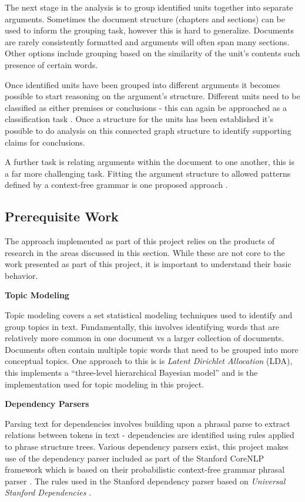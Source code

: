         The next stage in the analysis is to group identified units together into separate arguments. Sometimes the document structure (chapters and sections) can be used to inform the grouping task, however this is hard to generalize. Documents are rarely consistently formatted and arguments will often span many sections. Other options include grouping based on the similarity of the unit's contents such presence of certain words. \cite{palau2009argumentation}

        Once identified units have been grouped into different arguments it becomes possible to start reasoning on the argument's structure. Different units need to be classified as either premises or conclusions - this can again be approached as a classification task \cite{palau2009argumentation}. Once a structure for the units has been established it's possible to do analysis on this connected graph structure to identify supporting claims for conclusions.

        A further task is relating arguments within the document to one another, this is a far more challenging task. Fitting the argument structure to allowed patterns defined by a context-free grammar is one proposed approach \cite{palau2009argumentation}.

    \tocless\subsection{Prerequisite Work}
      The approach implemented as part of this project relies on the products of research in the areas discussed in this section. While these are not core to the work presented as part of this project, it is important to understand their basic behavior.

      \noindent\textbf{Topic Modeling}

        \noindent Topic modeling covers a set statistical modeling techniques used to identify and group topics in text. Fundamentally, this involves identifying words that are relatively more common in one document vs a larger collection of documents. Documents often contain multiple topic words that need to be grouped into more conceptual topics. One approach to this is is \textit{Latent Dirichlet Allocation} (LDA), this implements a ``three-level hierarchical Bayesian model'' \cite{blei2003latent} and is the implementation used for topic modeling in this project.

      \noindent\textbf{Dependency Parsers}

        \noindent Parsing text for dependencies involves building upon a phrasal parse to extract relations between tokens in text - dependencies are identified using rules applied to phrase structure trees. Various dependency parsers exist, this project makes use of the dependency parser included as part of the Stanford CoreNLP framework \cite{de2006generating} which is based on their probabilistic context-free grammar phrasal parser \cite{klein2003accurate}. The rules used in the Stanford dependency parser based on \textit{Universal Stanford Dependencies} \cite{de2014universal}.

